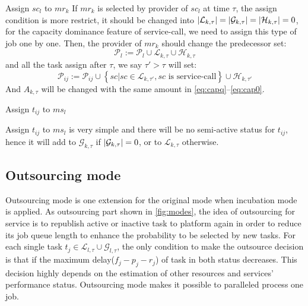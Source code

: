 \begin{asparaenum}
\item Assign $sc_l$ to $mr_k$
If $mr_k$ is selected by provider of $sc_l$ at time $\tau$, the assign condition is more restrict, it should be changed into $\left|\mathcal{L}_{k,\tau}\right| = \left|\mathcal{G}_{k,\tau}\right| = \left|\mathcal{H}_{k,\tau}\right| = 0$, for the capacity dominance feature of service-call, we need to assign this type of job one by one. Then, the provider of $mr_k$ should change the predecessor set:
\begin{equation}
	\mathcal{P}_l := \mathcal{P}_l\cup \mathcal{L}_{k,\tau} \cup \mathcal{H}_{k,\tau}
\end{equation}
and all the task assign after $\tau$, we say $\tau'>\tau$ will set:
\begin{equation}
	\mathcal{P}_{ij} := \mathcal{P}_{ij}\cup \left\{ sc| sc\in\mathcal{L}_{k,\tau'},sc \text{ is service-call} \right\} \cup \mathcal{H}_{k,\tau'}
\end{equation}
And $A_{k,\tau}$ will be changed with the same amount in \autoref{eq:capq}--\ref{eq:cap0}.
\item Assign $t_{ij}$ to $ms_l$
\end{asparaenum}
Assign $t_{ij}$ to $ms_l$ is very simple and there will be no semi-active status for $t_{ij}$, hence it will add to $\mathcal{G}_{k,\tau}$ if $\left|\mathcal{G}_{k,\tau}\right|=0$, or to $\mathcal{L}_{k,\tau}$ otherwise.





\subsection{Outsourcing mode} %
\label{sub:outsource_mode}
Outsourcing mode is one extension for the original mode when incubation mode is applied. As outsourcing part shown in \autoref{fig:modes},
the idea of outsourcing for service is to republish active or inactive task to platform again in order to reduce its job queue length to enhance the probability to be selected by new tasks. For each single task $t_j\in\mathcal{L}_{l,\tau}\cup\mathcal{G}_{l,\tau}$, the only condition to make the outsource decision is that if the maximum delay($f_j-p_j-r_j$) of task in both status decreases. This decision highly depends on the estimation of other resources and services' performance status. Outsourcing mode makes it possible to paralleled process one job.

